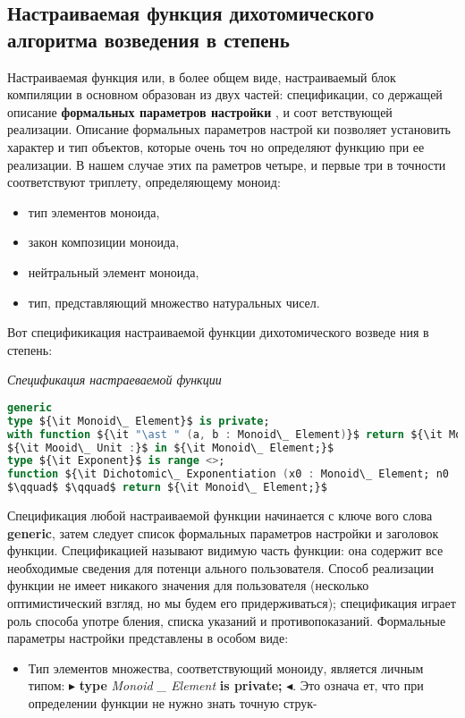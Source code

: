 \documentclass{mai_book}
\begin{document}
\subsection{ Настраиваемая функция дихотомического алгоритма возведения в степень}

\noindent Настраиваемая функция или, в более общем виде, настраиваемый блок
компиляции в основном образован из двух частей: спецификации, со­
держащей описание {\bf формальных параметров настройки} , и соот­
ветствующей реализации. Описание формальных параметров настрой­
ки позволяет установить характер и тип объектов, которые очень точ­
но определяют функцию при ее реализации. В нашем случае этих па­
раметров четыре, и первые три в точности соответствуют триплету,
определяющему моноид:
\begin{itemize}
\item тип элементов моноида,
\item закон композиции моноида,
\item нейтральный элемент моноида,
\item тип, представляющий множество натуральных чисел.
\end{itemize}
\noindent Вот спецификикация настраиваемой функции дихотомического возведе­
ния в степень:
\begin{center}
\parbox{8cm}{
{\it {\small Спецификация настраеваемой функции}}}
\end{center}
\begin{lstlisting}[mathescape=true, language=Ada, basicstyle=\small]
generic
type ${\it Monoid\_ Element}$ is private;
with function ${\it "\ast " (a, b : Monoid\_ Element)}$ return ${\it Monoid\_ Element;}$
${\it Mooid\_ Unit :}$ in ${\it Monoid\_ Element;}$
type ${\it Exponent}$ is range <>;
function ${\it Dichotomic\_ Exponentiation (x0 : Monoid\_ Element; n0 : exponent)}$
$\qquad$ $\qquad$ return ${\it Monoid\_ Element;}$
\end{lstlisting}

Спецификация любой настраиваемой функции начинается с ключе­
вого слова {\bf generic}, затем следует список формальных параметров
настройки и заголовок функции. Спецификацией называют видимую
часть функции: она содержит все необходимые сведения для потенци­
ального пользователя. Способ реализации функции не имеет никакого
значения для пользователя (несколько оптимистический взгляд, но мы
будем его придерживаться); спецификация играет роль способа употре­
бления, списка указаний и противопоказаний. Формальные параметры
настройки представлены в особом виде:
\begin{itemize}
\item Тип элементов множества, соответствующий моноиду, является
личным типом: $\blacktriangleright$ {\bf type} {\it Monoid \_  Element} {\bf is private;} $\blacktriangleleft$. Это означа­
ет, что при определении функции не нужно знать точную струк-
\end{itemize}
\end{document}
